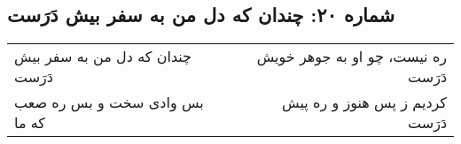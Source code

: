 \begin{center}
\section*{شماره ۲۰: چندان که دل من به سفر بیش دَرَست}
\label{sec:020}
\begin{longtable}{l p{0.5cm} r}
چندان که دل من به سفر بیش دَرَست
&&
ره نیست، چو او به جوهر خویش دَرَست
\\
بس وادی سخت و بس ره صعب که ما
&&
کردیم ز پس هنوز و ره پیش دَرَست
\\
\end{longtable}
\end{center}
